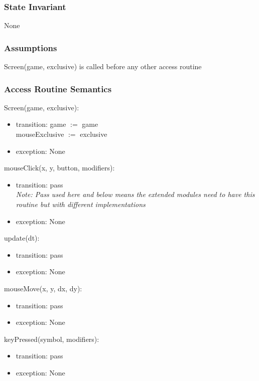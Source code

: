 \documentclass{article}
\begin{document}
\subsubsection {State Invariant}
None

\subsubsection {Assumptions}
Screen(game, exclusive) is called before any other access routine

\subsubsection {Access Routine Semantics}
\noindent Screen(game, exclusive):
\begin{itemize}
\item transition: game $:=$ game\\
    mouseExclusive $:=$ exclusive
\item exception: None
\end{itemize}\vspace{6mm}

\noindent mouseClick(x, y, button, modifiers):
\begin{itemize}
\item transition: pass\\
\textit{Note: Pass used here and below means the extended modules need to have this routine but with different implementations}
\item exception: None
\end{itemize}\vspace{6mm}

\noindent update(dt):
\begin{itemize}
\item transition: pass
\item exception: None
\end{itemize}\vspace{6mm}

\noindent mouseMove(x, y, dx, dy):
\begin{itemize}
\item transition: pass
\item exception: None
\end{itemize}\vspace{6mm}

\noindent keyPressed(symbol, modifiers):
\begin{itemize}
\item transition: pass
\item exception: None
\end{itemize}\vspace{6mm}
\end{document}
